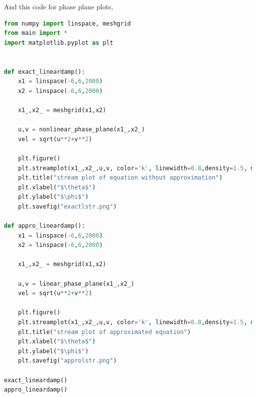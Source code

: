 \documentclass[11pt,a4paper]{article}
\begin{document}
And this code for phase plane plots,
\begin{lstlisting}[language=Python]
    from numpy import linspace, meshgrid
from main import *
import matplotlib.pyplot as plt


def exact_lineardamp():
    x1 = linspace(-6,6,2000)
    x2 = linspace(-6,6,2000)

    x1_,x2_ = meshgrid(x1,x2)

    u,v = nonlinear_phase_plane(x1_,x2_)
    vel = sqrt(u**2+v**2)

    plt.figure()
    plt.streamplot(x1_,x2_,u,v, color='k', linewidth=0.8,density=1.5, minlength=0.01, arrowsize=0.8,arrowstyle="->")
    plt.title("stream plot of equation without approximation")
    plt.xlabel("$\theta$")
    plt.ylabel("$\phi$")
    plt.savefig("exactlstr.png")

def appro_lineardamp():
    x1 = linspace(-6,6,2000)
    x2 = linspace(-6,6,2000)

    x1_,x2_ = meshgrid(x1,x2)

    u,v = linear_phase_plane(x1_,x2_)
    vel = sqrt(u**2+v**2)

    plt.figure()
    plt.streamplot(x1_,x2_,u,v, color='k', linewidth=0.8,density=1.5, minlength=0.01, arrowsize=0.8,arrowstyle="->")
    plt.title("stream plot of approximated equation")
    plt.xlabel("$\theta$")
    plt.ylabel("$\phi$")
    plt.savefig("approlstr.png")

exact_lineardamp()
appro_lineardamp()

  \end{lstlisting}






\end{document}

